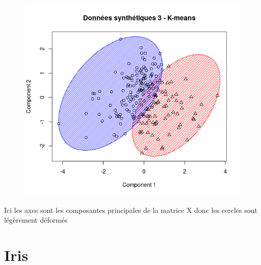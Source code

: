 \documentclass[a4paper, titlepage]{report}
\begin{document}
\begin{figure}[h]
\begin{center}
		\includegraphics[scale = 0.22]{./doc/hclust-synt-3-k.png}
	\end{center}
\end{figure}

\tiny{Ici les axes sont les composantes principales de la matrice X donc les cercles sont légèrement déformés}

\newpage

\section{Iris}
\end{document}
